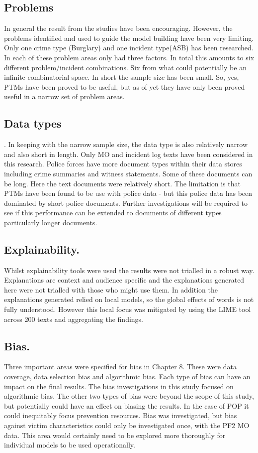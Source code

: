 \subsection{Problems} In general the result from the studies have been encouraging. However, the problems identified and used to guide the model building have been very limiting. Only one crime type (Burglary) and one incident type(ASB) has been researched. In each of these problem areas only had three factors. In total this amounts to six different problem/incident combinations. Six from what could potentially be an infinite combinatorial space. In short the sample size has been small. So, yes, PTMs have been proved to be useful, but as of yet they have only been proved useful in a narrow set of problem areas. 

\subsection{Data types}. In keeping with the narrow sample size, the data type is also relatively narrow and also short in length. Only MO and incident log texts have been considered in this research. Police forces have  more document types within their data stores including crime summaries and witness statements. Some of these documents can be long. Here the text documents were relatively short. The limitation is that PTMs have been found to be use with police data - but this police data has been dominated by short police documents. Further investigations will be required to see if this performance can be extended to documents of different types particularly longer documents.   

\subsection{Explainability.} Whilst explainability tools were used the results were not trialled in a robust way. Explanations are context and audience specific and the explanations generated here were not trialled with those who might use them. In addition the explanations generated relied on local models, so the global effects of words is not fully understood. However this local focus was mitigated by using the LIME tool across 200 texts and aggregating the findings. 

\subsection{Bias.} Three important areas were specified for bias in Chapter 8. These were data coverage, data selection bias and algorithmic bias. Each type of bias can have an impact on the final results. The bias investigations in this study focused on algorithmic bias. The other two types of bias were beyond the scope of this study, but potentially could have an effect on biasing the results. In the case of POP it could inequitably focus prevention resources. Bias was investigated, but bias against victim characteristics could only be investigated once, with the PF2 MO data. This area would certainly need to be explored more thoroughly for individual models to be used operationally. 


